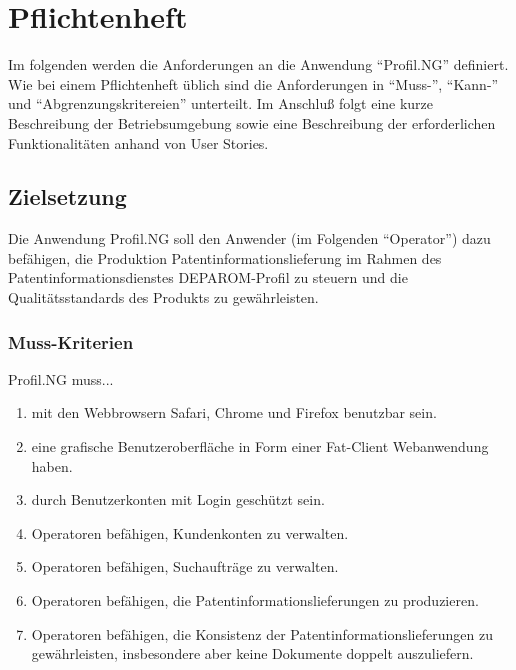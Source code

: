 
\chapter{Pflichtenheft} %

\label{ch:Pflichtenheft} %


Im folgenden werden die Anforderungen an die Anwendung "`Profil.NG"' definiert.
Wie bei einem Pflichtenheft üblich sind die Anforderungen in "`Muss-"',
"`Kann-"' und "`Abgrenzungskritereien"' unterteilt. Im Anschluß folgt eine kurze
Beschreibung der Betriebsumgebung sowie eine Beschreibung der erforderlichen
Funktionalitäten anhand von User Stories.

\section{Zielsetzung}

Die Anwendung Profil.NG soll den Anwender (im Folgenden "`Operator"') dazu
befähigen, die Produktion Patentinformationslieferung im Rahmen des
Patentinformationsdienstes DEPAROM-Profil zu steuern und die Qualitätsstandards
des Produkts zu gewährleisten.

\subsection{Muss-Kriterien}

Profil.NG muss...

\begin{enumerate}
  \item{mit den Webbrowsern Safari, Chrome und Firefox benutzbar sein.}
  \item{eine grafische Benutzeroberfläche in Form einer Fat-Client Webanwendung
        haben.}
  \item{durch Benutzerkonten mit Login geschützt sein.}
  \item{Operatoren befähigen, Kundenkonten zu verwalten.}
  \item{Operatoren befähigen, Suchaufträge zu verwalten.}
  \item{Operatoren befähigen, die Patentinformationslieferungen zu produzieren.}
  \item{Operatoren befähigen, die Konsistenz der Patentinformationslieferungen
        zu gewährleisten, insbesondere aber keine Dokumente doppelt
        auszuliefern.}
\end{enumerate}

